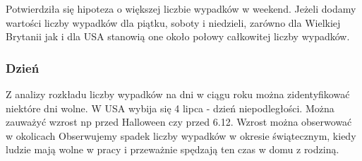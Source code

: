 Potwierdziła się hipoteza o większej liczbie wypadków w weekend. Jeżeli
dodamy wartości liczby wypadków dla piątku, soboty i niedzieli, zarówno
dla Wielkiej Brytanii jak i dla USA stanowią one około połowy całkowitej
liczby wypadków.

\subsubsection{Dzień}\label{dzien}

Z analizy rozkładu liczby wypadków na dni w ciągu roku można
zidentyfikować niektóre dni wolne. W USA wybija się 4 lipca - dzień
niepodległości. Można zauważyć wzrost np przed Halloween czy przed 6.12.
Wzrost można obserwować w okolicach Obserwujemy spadek liczby wypadków w
okresie świątecznym, kiedy ludzie mają wolne w pracy i przeważnie
spędzają ten czas w domu z rodziną.
